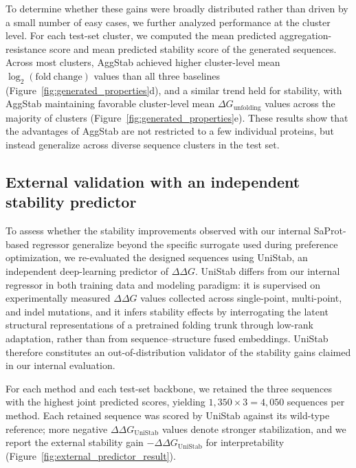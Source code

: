 \documentclass[pdflatex,sn-mathphys-num]{sn-jnl}%
\theoremstyle{thmstyleone}%
\theoremstyle{thmstyletwo}%
\theoremstyle{thmstylethree}%
\begin{document}
To determine whether these gains were broadly distributed rather than driven by a small number of easy cases, we further analyzed performance at the cluster level. For each test-set cluster, we computed the mean predicted aggregation-resistance score and mean predicted stability score of the generated sequences. Across most clusters, AggStab achieved higher cluster-level mean $\log_2(\mathrm{fold\ change})$ values than all three baselines (Figure~\ref{fig:generated_properties}d), and a similar trend held for stability, with AggStab maintaining favorable cluster-level mean $\Delta G_{\mathrm{unfolding}}$ values across the majority of clusters (Figure~\ref{fig:generated_properties}e). These results show that the advantages of AggStab are not restricted to a few individual proteins, but instead generalize across diverse sequence clusters in the test set.

\subsection{External validation with an independent stability predictor}

To assess whether the stability improvements observed with our internal SaProt-based regressor generalize beyond the specific surrogate used during preference optimization, we re-evaluated the designed sequences using UniStab, an independent deep-learning predictor of $\Delta\Delta G$. UniStab differs from our internal regressor in both training data and modeling paradigm: it is supervised on experimentally measured $\Delta\Delta G$ values collected across single-point, multi-point, and indel mutations, and it infers stability effects by interrogating the latent structural representations of a pretrained folding trunk through low-rank adaptation, rather than from sequence--structure fused embeddings. UniStab therefore constitutes an out-of-distribution validator of the stability gains claimed in our internal evaluation.

For each method and each test-set backbone, we retained the three sequences with the highest joint predicted scores, yielding $1{,}350 \times 3 = 4{,}050$ sequences per method. Each retained sequence was scored by UniStab against its wild-type reference; more negative $\Delta\Delta G_{\mathrm{UniStab}}$ values denote stronger stabilization, and we report the external stability gain $-\Delta\Delta G_{\mathrm{UniStab}}$ for interpretability (Figure~\ref{fig:external_predictor_result}).
\end{document}
